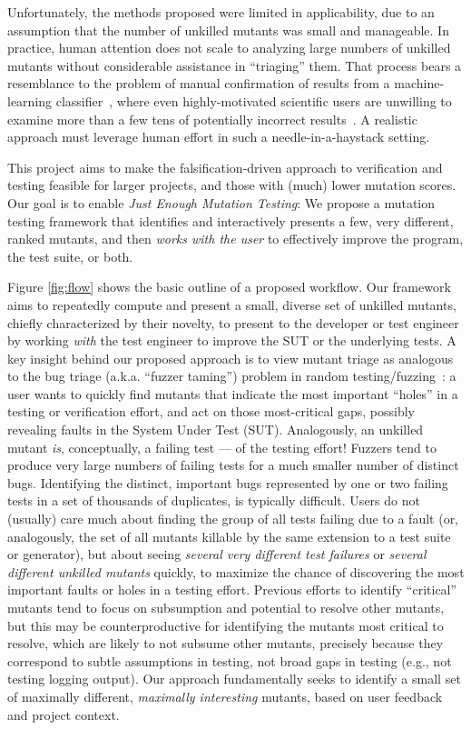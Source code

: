 Unfortunately, the
methods proposed were limited in applicability, due to an
assumption that the number of unkilled mutants was small and manageable.
In practice, human
attention does not scale to analyzing large numbers of
unkilled mutants without considerable assistance in ``triaging'' them.  That process bears a
resemblance to the problem of manual confirmation of results from a
machine-learning classifier~\cite{OnlyOracle,EndUserMistake}, where even highly-motivated scientific
users are unwilling to examine more than a few tens of
potentially incorrect results~\cite{Segal}.
A realistic approach must 
leverage human effort in such a needle-in-a-haystack setting.

This project aims to make the falsification-driven approach to verification and testing feasible for larger
projects, and those with (much) lower mutation scores.
Our goal is to enable \emph{Just Enough Mutation Testing}: We propose a mutation
testing framework that identifies and interactively presents a few, very
different, ranked mutants, and then \emph{works with the user} to 
effectively improve the program, the test suite, or both.

Figure \ref{fig:flow} shows the basic outline of a proposed workflow.
%
Our framework aims to repeatedly compute and present a small, 
diverse set of unkilled
mutants, chiefly characterized by their novelty, to present to the developer or
test engineer by working
 \emph{with} the test engineer to improve the SUT or
the underlying tests.
A key insight behind our proposed approach is to view mutant triage as
analogous to the bug triage
(a.k.a.  ``fuzzer
taming'') problem in random testing/fuzzing~\cite{PLDI13,distMut,SemCrash,vantonder-ase18}:  a user wants
to quickly find mutants that indicate the most important ``holes'' in a testing
or verification effort, and act on those most-critical gaps, possibly revealing
faults in the System Under Test (SUT).
Analogously, an unkilled mutant \emph{is}, conceptually, a failing test --- of the testing
effort!
Fuzzers tend to produce very large numbers of failing tests for a much
smaller number of distinct bugs. Identifying the distinct, important bugs
represented by one or two failing tests in a set of thousands of duplicates, is typically
difficult. 
Users do not (usually) care much
about finding the group of all tests failing due to a fault (or, analogously, the
set of all mutants killable by the same extension to a test suite or
generator), but about seeing \emph{several very different test failures}
or \emph{several  different unkilled mutants} quickly, to maximize the chance of
discovering the most important faults or holes in a testing effort.
%
Previous efforts to identify ``critical'' mutants tend to focus on
subsumption and potential to resolve other mutants, but this may be
counterproductive for identifying the mutants most critical to
resolve, which are likely to not subsume other mutants, precisely
because they correspond to subtle assumptions in testing, not broad
gaps in testing (e.g., not testing logging output).
Our approach fundamentally seeks to identify a small set of
maximally different, \emph{maximally interesting} mutants,
based on user feedback and project context.

